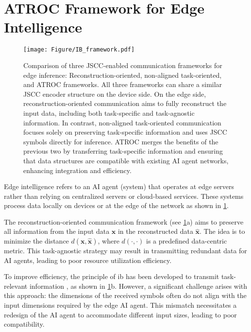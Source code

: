 \section{ATROC Framework for Edge Intelligence}
\label{sec:aligned_TOC_framework}
\begin{figure}[t]
    \begin{center}
    \texttt{[image: Figure/IB\_framework.pdf]}
    \end{center}
    \caption{Comparison of three JSCC-enabled communication frameworks for edge inference: Reconstruction-oriented, non-aligned task-oriented, and ATROC frameworks. All three frameworks can share a similar JSCC encoder structure on the device side. On the edge side, reconstruction-oriented communication aims to fully reconstruct the input data, including both task-specific and task-agnostic information. In contrast, non-aligned task-oriented communication focuses solely on preserving task-specific information and uses JSCC symbols directly for inference. ATROC merges the benefits of the previous two by transferring task-specific information and ensuring that data structures are compatible with existing AI agent networks, enhancing integration and efficiency.}
    \label{fig:IB_framework}
\end{figure}
Edge intelligence refers to an AI agent (system) that operates at edge servers rather than relying on centralized servers or cloud-based services. These systems process data locally on devices or at the edge of the network as shown in \cref{fig:IB_framework}. 

The reconstruction-oriented communication framework (see \cref{fig:IB_framework}a) aims to preserve all information from the input data $\bm{x}$ in the reconstructed data $\hat{\bm{x}}$. The idea is to minimize the distance $d(\bm{x}, \hat{\bm{x}})$, where $d(\cdot,\cdot)$ is a predefined data-centric metric. This task-agnostic strategy may result in transmitting redundant data for AI agents, leading to poor resource utilization efficiency.

To improve efficiency, the principle of \gls{ib} has been developed to transmit task-relevant information \cite{Shao_2022_LTO}, as shown in \cref{fig:IB_framework}b. 
However, a significant challenge arises with this approach: the dimensions of the received symbols often do not align with the input dimensions required by the edge AI agent. This mismatch necessitates a redesign of the AI agent to accommodate different input sizes, leading to poor compatibility.

